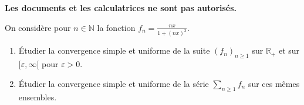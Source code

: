 \documentclass[a4paper,11pt,reqno]{amsart}
\begin{document}
\ifsolutions\else
\textbf{Les documents et les calculatrices ne sont pas autorisés.}

\hfill
\fi

\begin{exo}

  On considère pour $n\in\mathbb{N}$ la fonction $f_{n}=\frac{nx}{1+(nx)^3}$.
  \begin{enumerate}
    \item Étudier la convergence simple et uniforme de la suite $(f_{n})_{n\geq 1}$ sur $\mathbb{R}_{+}$ et sur $[\varepsilon,\infty[$ pour $\varepsilon>0$.

    \item Étudier la convergence simple et uniforme de la série $\sum_{n\geq 1}f_{n}$ sur ces mêmes ensembles.
  \end{enumerate}
\end{exo}
\end{document}
